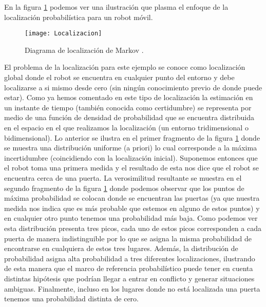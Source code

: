 En la figura \ref{Markov_Localization} podemos ver una ilustración que plasma el enfoque de la localización probabilística para un robot móvil. 
\begin{figure}[t!]
\centering
\texttt{[image: Localizacion]}
\caption{Diagrama de localización de Markov \cite{thrun_probabilistic_2005}.} \label{Markov_Localization}
\end{figure}
El problema de la localización para este ejemplo se conoce
como localización global donde el robot se encuentra en cualquier
punto del entorno y debe localizarse a si mismo desde cero
(sin ningún conocimiento previo de donde puede estar).
Como ya hemos comentado en este tipo de localización
la estimación en un instante de tiempo (también conocida como certidumbre) se representa por medio de una función de densidad de probabilidad que se encuentra distribuida en el espacio en el que realizamos la localización (un entorno tridimensional o bidimensional).
%
%
%
%
%
%
%
Lo anterior se ilustra en el primer fragmento de la figura \ref{Markov_Localization} donde se muestra una distribución uniforme (a priori) lo cual corresponde a la máxima incertidumbre (coincidiendo con la localización inicial). 
Suponemos entonces que el robot toma una primera medida y el resultado de esta nos dice que el robot se encuentra cerca de una puerta. 
La verosimilitud resultante se muestra en el segundo fragmento de la figura \ref{Markov_Localization} donde podemos observar que los puntos de máxima probabilidad se colocan donde se encuentran las puertas (ya que nuestra medida nos indica que es más probable que estemos en alguno de estos puntos) y en cualquier otro punto tenemos una probabilidad más baja. 
Como podemos ver esta distribución presenta tres picos, cada uno de estos picos corresponden a cada puerta de manera indistinguible por lo que se asigna la misma probabilidad de encontrarse en cualquiera de estos tres lugares.
Además, la distribución de probabilidad asigna alta probabilidad a tres diferentes localizaciones, ilustrando de esta manera que el marco de referencia probabilístico puede tener en cuenta distintas hipótesis que podrían llegar a entrar en conflicto y generar situaciones ambiguas. Finalmente, incluso en los lugares donde no está localizada una puerta tenemos una probabilidad distinta de cero.
